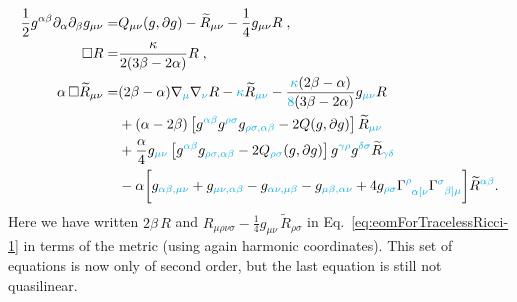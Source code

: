 \documentclass[a4paper,oneside,openany,11pt]{memoir}
\numberwithin{equation}{section} %
\newcommand{\aaron}[1]{{\color{cyan} #1}}
\begin{document}
\begin{align}
	\frac{1}{2}g^{\alpha\beta}\partial_{\alpha}\partial_{\beta}g_{\mu\nu} = &Q_{\mu\nu}(g,\partial g)-\widetilde{R}_{\mu\nu}
-\frac{1}{4}g_{\mu\nu}R\;, 	\label{eom:metric}
	\\
	\square R = &\frac{\kappa}{2(3\beta-2\alpha)}R\;, \label{eom:ricci_scalar}
	\\
	\alpha\,\square \widetilde{R}_{\mu\nu} = &
	(2 \beta - \alpha) \nabla_\aaron{\mu} \nabla_\aaron{\nu} R 
	- \aaron{\kappa} \widetilde{R}_\aaron{\mu\nu} 
	- \frac{\aaron{\kappa}(2 \beta - \alpha)}{\aaron{8}(3\beta - 2 \alpha)} g_\aaron{\mu\nu} R
	\nonumber \\
	&+(\alpha - 2 \beta)\left[g^\aaron{\alpha\beta}g^\aaron{\rho\sigma} g_\aaron{\rho\sigma,\alpha\beta} - 2 Q(g,\partial g) \right]\widetilde{R}_\aaron{\mu\nu} 
	\nonumber \\
	&+\frac{\alpha}{4} g_\aaron{\mu\nu} \left[ g^\aaron{\alpha\beta}g_\aaron{\rho\sigma,\alpha\beta} - 2 Q_\aaron{\rho\sigma} (g,\partial g) \right] g^\aaron{\gamma\rho}g^\aaron{\delta\sigma} \widetilde{R}_\aaron{\gamma\delta} 
	\nonumber \\
	&- \alpha \bigg[ g_\aaron{\alpha\beta,\mu\nu} + g_\aaron{\mu\nu,\alpha\beta} - g_\aaron{\alpha\nu,\mu\beta} - g_\aaron{\mu\beta,\alpha\nu} +4 g_\aaron{\rho\sigma} \Gamma\aaron{\indices{^\rho_{\alpha[\nu}}} \Gamma\aaron{\indices{^\sigma_{\beta]\mu}}} \bigg] \widetilde{R}^\aaron{\alpha\beta}. 	\label{eom:ricci_tensor}
\end{align}
Here we have written $2\beta\,R$ and $R_{\mu\rho\nu\sigma} -\frac{1}{4} g_{\mu\nu}\, \widetilde{R}_{\rho\sigma}$ in Eq.~\eqref{eq:eomForTracelessRicci-1} in terms of the metric (using again harmonic coordinates).
This set of equations is now only of second order, but the last equation is still not quasilinear.
\end{document}

